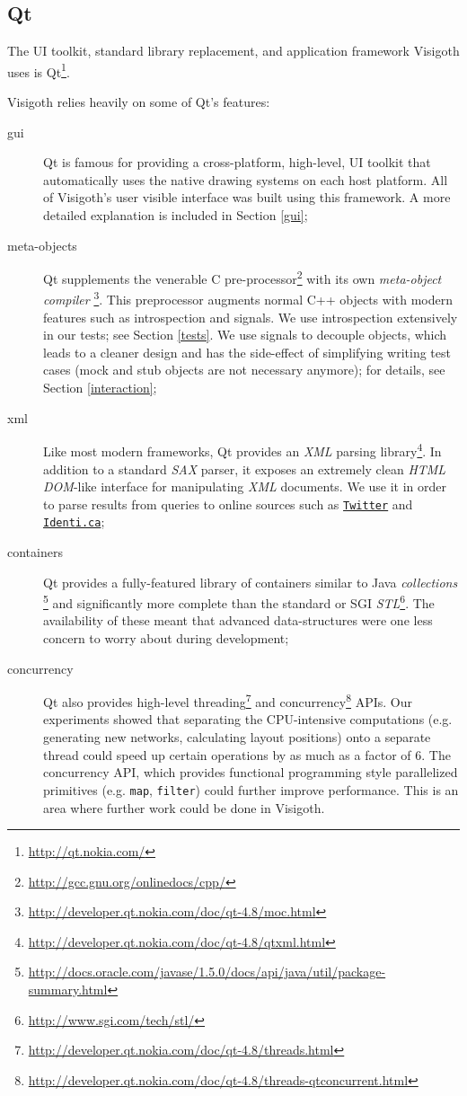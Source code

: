 \documentclass[a4paper,11pt,titlepage]{article}
\let\stdhref\href
\renewcommand{\href}[2]{\stdhref{#1}{\texttt{#2}}}
\newcommand{\code}[1]{\texttt{#1}}
\newcommand{\buzz}[1]{\emph{#1}}
\begin{document}
\subsection{Qt}

The UI toolkit, standard library replacement, and application
framework Visigoth uses is Qt\footnote{\url{http://qt.nokia.com/}}.

Visigoth relies heavily on some of Qt's features:
\begin{description}
\item [gui] Qt is famous for providing a cross-platform, high-level,
  UI toolkit that automatically uses the native drawing systems on
  each host platform. All of Visigoth's user visible interface was
  built using this framework. A more detailed explanation is included
  in Section \ref{gui};
\item [meta-objects] Qt supplements the venerable C
  pre-processor\footnote{\url{http://gcc.gnu.org/onlinedocs/cpp/}}
  with its own \buzz{meta-object
    compiler} \footnote{\url{http://developer.qt.nokia.com/doc/qt-4.8/moc.html}}.
  This preprocessor augments normal C++ objects with modern features
  such as introspection and signals. We use introspection extensively
  in our tests; see Section \ref{tests}. We use signals to decouple
  objects, which leads to a cleaner design and has the side-effect of
  simplifying writing test cases (mock and stub objects are not
  necessary anymore); for details, see Section \ref{interaction};
\item [xml] Like most modern frameworks, Qt provides an \buzz{XML}
  parsing
  library\footnote{\url{http://developer.qt.nokia.com/doc/qt-4.8/qtxml.html}}.
  In addition to a standard \buzz{SAX} parser, it exposes an extremely
  clean \buzz{HTML DOM}-like interface for manipulating \buzz{XML}
  documents. We use it in order to parse results from queries to
  online sources such as \href{http://twitter.com}{Twitter} and
  \href{http://identi.ca}{Identi.ca};
\item [containers] Qt provides a fully-featured library of containers
  similar to Java
  \buzz{collections} \footnote{\url{http://docs.oracle.com/javase/1.5.0/docs/api/java/util/package-summary.html}}
  and significantly more complete than the standard or SGI
  \buzz{STL}\footnote{\url{http://www.sgi.com/tech/stl/}}. The
  availability of these meant that advanced data-structures were one
  less concern to worry about during development;
\item [concurrency] Qt also provides high-level
  threading\footnote{\url{http://developer.qt.nokia.com/doc/qt-4.8/threads.html}}
  and
  concurrency\footnote{\url{http://developer.qt.nokia.com/doc/qt-4.8/threads-qtconcurrent.html}}
  APIs. Our experiments showed that separating the CPU-intensive
  computations (e.g. generating new networks, calculating layout
  positions) onto a separate thread could speed up certain operations
  by as much as a factor of $6$. The concurrency API, which provides
  functional programming style parallelized primitives
  (e.g. \code{map}, \code{filter}) could further improve performance.
  This is an area where further work could be done in Visigoth.
\end{description}
\end{document}
